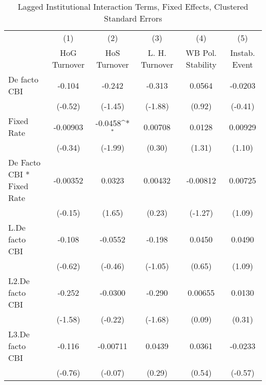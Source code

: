 {
\def\sym#1{\ifmmode^{#1}\else\(^{#1}\)\fi}
\begin{longtable}{l*{5}{c}}
\caption{Lagged Institutional Interaction Terms, Fixed Effects, Clustered Standard Errors \label{intlagsDF}}\\
\hline\hline\endfirsthead\hline\endhead\hline\endfoot\endlastfoot
                &\multicolumn{1}{c}{(1)}&\multicolumn{1}{c}{(2)}&\multicolumn{1}{c}{(3)}&\multicolumn{1}{c}{(4)}&\multicolumn{1}{c}{(5)}\\
                &\multicolumn{1}{c}{HoG Turnover}&\multicolumn{1}{c}{HoS Turnover}&\multicolumn{1}{c}{L. H. Turnover}&\multicolumn{1}{c}{WB Pol. Stability}&\multicolumn{1}{c}{Instab. Event}\\
\hline
De facto CBI    &   -0.104         &   -0.242         &   -0.313         &   0.0564         &  -0.0203         \\
                &  (-0.52)         &  (-1.45)         &  (-1.88)         &   (0.92)         &  (-0.41)         \\
[1em]
Fixed Rate      & -0.00903         &  -0.0458\sym{*}  &  0.00708         &   0.0128         &  0.00929         \\
                &  (-0.34)         &  (-1.99)         &   (0.30)         &   (1.31)         &   (1.10)         \\
[1em]
De Facto CBI * Fixed Rate& -0.00352         &   0.0323         &  0.00432         & -0.00812         &  0.00725         \\
                &  (-0.15)         &   (1.65)         &   (0.23)         &  (-1.27)         &   (1.09)         \\
[1em]
L.De facto CBI  &   -0.108         &  -0.0552         &   -0.198         &   0.0450         &   0.0490         \\
                &  (-0.62)         &  (-0.46)         &  (-1.05)         &   (0.65)         &   (1.09)         \\
[1em]
L2.De facto CBI &   -0.252         &  -0.0300         &   -0.290         &  0.00655         &   0.0130         \\
                &  (-1.58)         &  (-0.22)         &  (-1.68)         &   (0.09)         &   (0.31)         \\
[1em]
L3.De facto CBI &   -0.116         & -0.00711         &   0.0439         &   0.0361         &  -0.0233         \\
                &  (-0.76)         &  (-0.07)         &   (0.29)         &   (0.54)         &  (-0.57)         \\

\end{longtable}}

